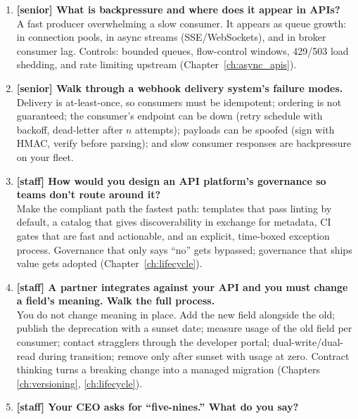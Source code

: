\begin{enumerate}[label=\textbf{Q\arabic*.}, leftmargin=3.2em]
    at the cost of query-complexity governance. gRPC: internal
    service-to-service, strict schemas, streaming, and low latency, at
    the cost of browser and tooling friction. Choose per consumer, not
    per fashion (Chapters \ref{ch:graphql}--\ref{ch:grpc}).
  \item \textbf{[senior] What is backpressure and where does it appear in
    APIs?}\\
    A fast producer overwhelming a slow consumer. It appears as queue
    growth: in connection pools, in async streams (SSE/WebSockets), and in
    broker consumer lag. Controls: bounded queues, flow-control windows,
    429/503 load shedding, and rate limiting upstream
    (Chapter~\ref{ch:async_apis}).
  \item \textbf{[senior] Walk through a webhook delivery system's failure
    modes.}\\
    Delivery is at-least-once, so consumers must be idempotent; ordering
    is not guaranteed; the consumer's endpoint can be down (retry
    schedule with backoff, dead-letter after $n$ attempts); payloads can
    be spoofed (sign with HMAC, verify before parsing); and slow consumer
    responses are backpressure on your fleet.
  \item \textbf{[staff] How would you design an API platform's governance
    so teams don't route around it?}\\
    Make the compliant path the fastest path: templates that pass linting
    by default, a catalog that gives discoverability in exchange for
    metadata, CI gates that are fast and actionable, and an explicit,
    time-boxed exception process. Governance that only says ``no'' gets
    bypassed; governance that ships value gets adopted
    (Chapter~\ref{ch:lifecycle}).
  \item \textbf{[staff] A partner integrates against your API and you must
    change a field's meaning. Walk the full process.}\\
    You do not change meaning in place. Add the new field alongside the
    old; publish the deprecation with a sunset date; measure usage of the
    old field per consumer; contact stragglers through the developer
    portal; dual-write/dual-read during transition; remove only after
    sunset with usage at zero. Contract thinking turns a breaking change
    into a managed migration (Chapters \ref{ch:versioning},
    \ref{ch:lifecycle}).
  \item \textbf{[staff] Your CEO asks for ``five-nines.'' What do you say?}\\

\end{enumerate}
